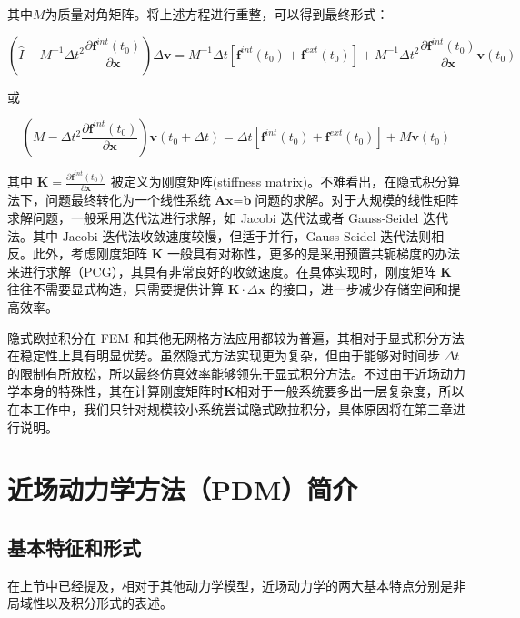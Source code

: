 其中$M$为质量对角矩阵。将上述方程进行重整，可以得到最终形式：

\begin{equation}
\left(\hat{I} - M^{-1}\Delta t^2 \frac{\partial \textbf{f}^{int}(t_0)}{\partial \textbf{x}}\right)\Delta \textbf{v} = M^{-1}\Delta t\left[\textbf{f}^{int}(t_0) + \textbf{f}^{ext}(t_0)\right]
                  + M^{-1}\Delta t^2 \frac{\partial \textbf{f}^{int}(t_0)}{\partial \textbf{x}}\textbf{v}(t_0)
\end{equation}

或

\begin{equation}
\left(M - \Delta t^2 \frac{\partial \textbf{f}^{int}(t_0)}{\partial \textbf{x}}\right)\textbf{v}(t_0 + \Delta t) = \Delta t\left[\textbf{f}^{int}(t_0) + \textbf{f}^{ext}(t_0)\right]
                  + M\textbf{v}(t_0)
\end{equation}

其中 $\textbf{K} = \frac{\partial \textbf{f}^{int}(t_0)}{\partial \textbf{x}}$ 被定义为刚度矩阵(stiffness matrix)。不难看出，在隐式积分算法下，问题最终转化为一个线性系统$\textbf{Ax} = \textbf{b}$问题的求解。对于大规模的线性矩阵求解问题，一般采用迭代法进行求解，如 Jacobi 迭代法或者 Gauss-Seidel 迭代法。其中 Jacobi 迭代法收敛速度较慢，但适于并行，Gauss-Seidel 迭代法则相反。此外，考虑刚度矩阵 $\textbf{K}$ 一般具有对称性，更多的是采用预置共轭梯度的办法来进行求解（PCG），其具有非常良好的收敛速度。在具体实现时，刚度矩阵 $\textbf{K}$ 往往不需要显式构造，只需要提供计算 $\textbf{K} \cdot \Delta \textbf{x}$ 的接口，进一步减少存储空间和提高效率。

隐式欧拉积分在 FEM 和其他无网格方法应用都较为普遍，其相对于显式积分方法在稳定性上具有明显优势。虽然隐式方法实现更为复杂，但由于能够对时间步 $\Delta t$的限制有所放松，所以最终仿真效率能够领先于显式积分方法。不过由于近场动力学本身的特殊性，其在计算刚度矩阵时$\textbf{K}$相对于一般系统要多出一层复杂度，所以在本工作中，我们只针对规模较小系统尝试隐式欧拉积分，具体原因将在第三章进行说明。


\section{近场动力学方法（PDM）简介}

\subsection{基本特征和形式}
\label{pdm_basic_feature}
在上节中已经提及，相对于其他动力学模型，近场动力学的两大基本特点分别是非局域性以及积分形式的表述。

